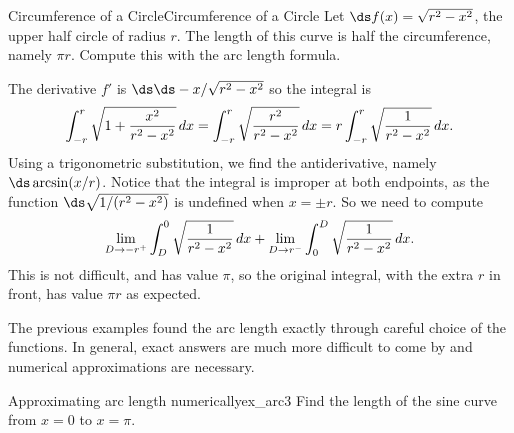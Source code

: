 \begin{example}{Circumference of a Circle}{Circumference of a Circle}\label{Circumference of a Circle} 
Let $\ds f(x) = \sqrt{r^2-x^2}$, the upper half circle of radius
$r$. The length of this curve is half the circumference, namely $\pi
r$. Compute this with the arc length formula.
\end{example}

\begin{solution}
The derivative $f'$ is $\ds \ds -x/\sqrt{r^2-x^2}$ so the integral is
$$
  \int_{-r}^r \sqrt{1+{x^2\over r^2-x^2}}\,dx
  =\int_{-r}^r \sqrt{r^2\over r^2-x^2}\,dx
  =r\int_{-r}^r \sqrt{1\over r^2-x^2}\,dx.
$$
Using a trigonometric substitution, we find the antiderivative, namely
$\ds \arcsin(x/r)$. Notice that the integral is improper at both
endpoints, as the function $\ds \sqrt{1/(r^2-x^2)}$ is undefined when
$x=\pm r$. So we need to compute
$$
  \lim_{D\to-r^+}\int_D^0  \sqrt{1\over r^2-x^2}\,dx +
  \lim_{D\to r^-}\int_0^D  \sqrt{1\over r^2-x^2}\,dx.
$$
This is not difficult, and has value $\pi$, so the original integral,
with the extra $r$ in front, has value $\pi r$ as expected.
\end{solution}

The previous examples found the arc length exactly through careful choice of the functions. In general, exact answers are much more difficult to come by and numerical approximations are necessary. \\


\begin{example}{Approximating arc length numerically}{ex_arc3}
{
Find the length of the sine curve from $x=0$ to $x=\pi$.}
\end{example}



